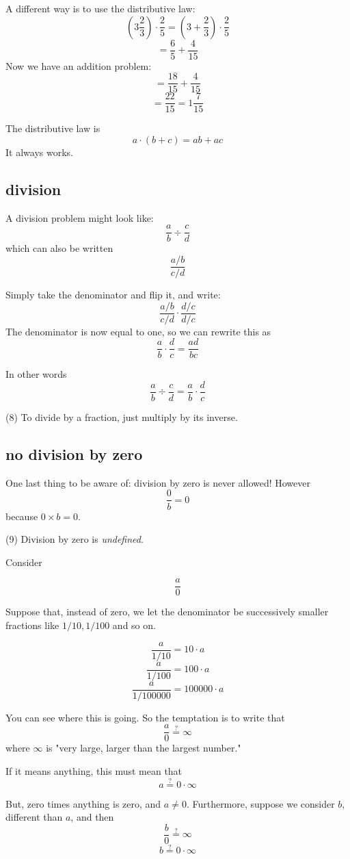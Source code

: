\documentclass[11pt, oneside]{article}
\begin{document}
A different way is to use the distributive law:
\[ (3\frac{2}{3}) \cdot \frac{2}{5} = (3 + \frac{2}{3}) \cdot \frac{2}{5} \]
\[ = \frac{6}{5} + \frac{4}{15} \]
Now we have an addition problem:
\[ = \frac{18}{15} + \frac{4}{15} \]  
\[ = \frac{22}{15} = 1\frac{7}{15} \]  

The distributive law is
\[ a \cdot (b + c) = ab + ac \]
It always works.

\subsection*{division}
A division problem might look like:
\[ \frac{a}{b} \div \frac{c}{d} \]
which can also be written
\[  \frac{a/b}{c/d} \]

Simply take the denominator and flip it, and write:
\[  \frac{a/b}{c/d} \cdot \frac{d/c}{d/c} \]
The denominator is now equal to one, so we can rewrite this as
\[ \frac{a}{b} \cdot \frac{d}{c} = \frac{ad}{bc} \]

In other words
\[ \frac{a}{b} \div \frac{c}{d} = \frac{a}{b} \cdot \frac{d}{c}\]

(8) To divide by a fraction, just multiply by its inverse.

\subsection*{no division by zero}

One last thing to be aware of:  division by zero is never allowed!  However
\[ \frac{0}{b} = 0 \]
because $0 \times b = 0$.

(9) Division by zero is \emph{undefined}.

Consider 

\[ \frac{a}{0} \]

Suppose that, instead of zero, we let the denominator be successively smaller fractions like $1/10, 1/100$ and so on.

\[ \frac{a}{1/10} = 10 \cdot a \]
\[ \frac{a}{1/100} = 100 \cdot a \]
\[ \frac{a}{1/100000} = 100000 \cdot a \]

You can see where this is going.  So the temptation is to write that
\[ \frac{a}{0} \stackrel{?}{=} \infty \]
where $\infty$ is "very large, larger than the largest number."

If it means anything, this must mean that
\[ a \stackrel{?}{=} 0 \cdot \infty \]

But, zero times anything is zero, and $a \ne 0$.  Furthermore, suppose we consider $b$, different than $a$, and then 
\[ \frac{b}{0} \stackrel{?}{=} \infty \]
\[ b \stackrel{?}{=} 0 \cdot \infty \]
\end{document}
